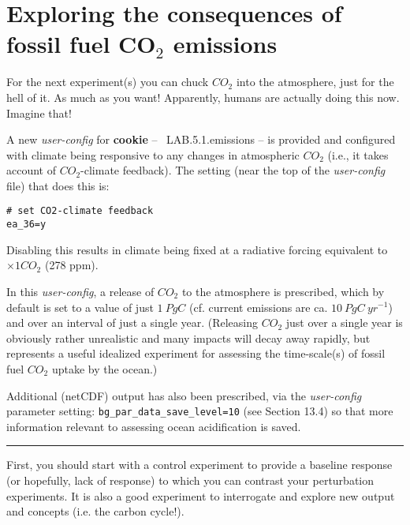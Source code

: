 \section{Exploring the consequences of fossil fuel CO$_{2}$ emissions}

For the next experiment(s) you can chuck \(CO_{2}\) into the atmosphere, just for the hell of it. As much as you want! Apparently, humans are actually doing this now. Imagine that!

\vspace{1mm}

A new \textit{user-config} for \textbf{cookie} -- \textsf{\footnotesize\ LAB.5.1.emissions} -- is provided and configured with climate being responsive to any changes in atmospheric \(CO_{2}\) (i.e., it takes account of \(CO_{2}\)-climate feedback). 
\vspace{1mm}
The setting (near the top of the \textit{user-config} file) that does this is:
\vspace{-2pt}\small\begin{verbatim}
# set CO2-climate feedback
ea_36=y
\end{verbatim}\normalsize\vspace{-2pt}
\noindent Disabling this results in climate being fixed at a radiative forcing equivalent to $\times 1 CO_{2}$ (278 ppm).

In this \textit{user-config}, a release of \(CO_{2}\) to the atmosphere is prescribed, which by default is set to a value of just \(1\:PgC\) (cf. current emissions are ca. \(10\:PgC\:yr^{-1}\)) and over an interval of just a single year. (Releasing \(CO_{2}\) just over a single year is obviously rather unrealistic and many impacts will decay away rapidly, but represents a useful idealized experiment for assessing the time-scale(s) of fossil fuel \(CO_{2}\) uptake by the ocean.)

\vspace{1mm}
Additional (netCDF) output has also been prescribed, via the \textit{user-config} parameter setting: \texttt{bg\_par\_data\_save\_level=10} (see Section 13.4) so that more information relevant to assessing ocean acidification is saved.

\vspace{1mm}
\noindent\rule{4cm}{0.1mm}
\vspace{2mm}

\noindent First, you should start with a control experiment to provide a baseline response (or hopefully, lack of response) to which you can contrast your perturbation experiments. It is also a good experiment to interrogate and explore new output and concepts (i.e. the carbon cycle!).

